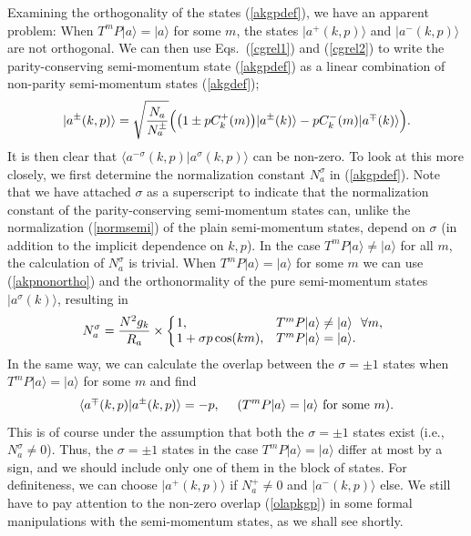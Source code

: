 \documentclass[draft,numberedheadings]{aipproc}
\begin{document}
Examining the orthogonality of the states (\ref{akgpdef}), we have an apparent problem: When $T^m P|a\rangle = |a\rangle$ for some $m$, the states 
$|a^+(k,p)\rangle$ and $|a^-(k,p)\rangle$ are not orthogonal. We can then use Eqs.~(\ref{cgrel1}) and (\ref{cgrel2}) to write the 
parity-conserving semi-momentum state (\ref{akgpdef}) as a linear combination of non-parity semi-momentum states (\ref{akgdef});
\begin{equation}
|a^\pm (k,p)\rangle=\sqrt{\frac{N_a}{N^\pm_a}}
\Bigl (\bigl (1 \pm pC^+_k(m) \bigr )|a^\pm (k)\rangle - pC^-_k(m)|a^\mp(k)\rangle \Bigr ).
\label{akpnonortho}
\end{equation}
It is then clear that $\langle a^{-\sigma} (k,p)|a^\sigma (k,p)\rangle$ can be non-zero. To look at this more closely, we first determine the normalization
constant $N^\sigma_a$ in (\ref{akgpdef}). Note that we have attached $\sigma$ as a superscript to indicate that the normalization constant of the 
parity-conserving semi-momentum states can, unlike the normalization (\ref{normsemi}) of the plain semi-momentum states, depend on $\sigma$ (in addition 
to the implicit dependence on $k,p$). In the case $T^m P|a\rangle \not= |a\rangle$ for all $m$, the calculation of $N^\sigma_a$ is trivial. When 
$T^m P|a\rangle = |a\rangle$ for some $m$ we can use (\ref{akpnonortho}) and the orthonormality of the pure semi-momentum states $|a^\sigma(k)\rangle$, resulting in
\begin{equation}
N^{\sigma}_a = \frac{N^2g_k}{R_a} \times
\left \{ \begin{array}{ll} 
\hbox{\hskip-1.5mm} 1, & T^m P|a\rangle \not= |a\rangle~~ \forall m, \\
\hbox{\hskip-1.5mm} 1 + \sigma p\cos(km), & T^m P|a\rangle = |a\rangle .
\end{array}\right.
\label{normkgp}
\end{equation}
In the same way, we can calculate the overlap between the $\sigma=\pm 1$ states when $T^m P|a\rangle = |a\rangle$ for some $m$ and find 
\begin{equation}
\langle a^\mp (k,p)|a^\pm (k,p)\rangle = -p,~~~~(T^m P|a\rangle = |a\rangle {\rm ~for~some~}m).
\label{olapkgp}
\end{equation}
This is of course under the assumption that both the $\sigma = \pm 1$ states exist (i.e., $N^\sigma_a \not =0$). Thus, the $\sigma = \pm 1$ states in 
the case $T^m P|a\rangle = |a\rangle$ differ at most by a sign, and we should include only one of them in the block of states. For definiteness, we can 
choose $|a^+(k,p)\rangle$ if $N^+_a \not=0$ and $|a^-(k,p)\rangle$ else. We still have to pay attention to the non-zero overlap (\ref{olapkgp}) in some 
formal manipulations with the semi-momentum states, as we shall see shortly.
\end{document}
